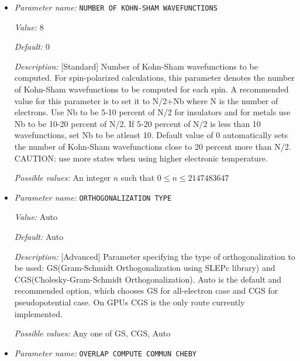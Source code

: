 \begin{itemize}
{\it Possible values:} A boolean value (true or false)
\item {\it Parameter name:} {\tt NUMBER OF KOHN-SHAM WAVEFUNCTIONS}
\label{parameters:SCF parameters/Eigen_2dsolver parameters/NUMBER OF KOHN_2dSHAM WAVEFUNCTIONS}
\label{parameters:SCF_20parameters/Eigen_2dsolver_20parameters/NUMBER_20OF_20KOHN_2dSHAM_20WAVEFUNCTIONS}


{\it Value:} 8


{\it Default:} 0


{\it Description:} [Standard] Number of Kohn-Sham wavefunctions to be computed. For spin-polarized calculations, this parameter denotes the number of Kohn-Sham wavefunctions to be computed for each spin. A recommended value for this parameter is to set it to N/2+Nb where N is the number of electrons. Use Nb to be 5-10 percent of N/2 for insulators and for metals use Nb to be 10-20 percent of N/2. If 5-20 percent of N/2 is less than 10 wavefunctions, set Nb to be atleast 10. Default value of 0 automatically sets the number of Kohn-Sham wavefunctions close to 20 percent more than N/2. CAUTION: use more states when using higher electronic temperature.


{\it Possible values:} An integer $n$ such that $0\leq n \leq 2147483647$
\item {\it Parameter name:} {\tt ORTHOGONALIZATION TYPE}
\label{parameters:SCF parameters/Eigen_2dsolver parameters/ORTHOGONALIZATION TYPE}
\label{parameters:SCF_20parameters/Eigen_2dsolver_20parameters/ORTHOGONALIZATION_20TYPE}


{\it Value:} Auto


{\it Default:} Auto


{\it Description:} [Advanced] Parameter specifying the type of orthogonalization to be used: GS(Gram-Schmidt Orthogonalization using SLEPc library) and CGS(Cholesky-Gram-Schmidt Orthogonalization). Auto is the default and recommended option, which chooses GS for all-electron case and CGS for pseudopotential case. On GPUs CGS is the only route currently implemented.


{\it Possible values:} Any one of GS, CGS, Auto
\item {\it Parameter name:} {\tt OVERLAP COMPUTE COMMUN CHEBY}
\label{parameters:SCF parameters/Eigen_2dsolver parameters/OVERLAP COMPUTE COMMUN CHEBY}
\label{parameters:SCF_20parameters/Eigen_2dsolver_20parameters/OVERLAP_20COMPUTE_20COMMUN_20CHEBY}



\end{itemize}
